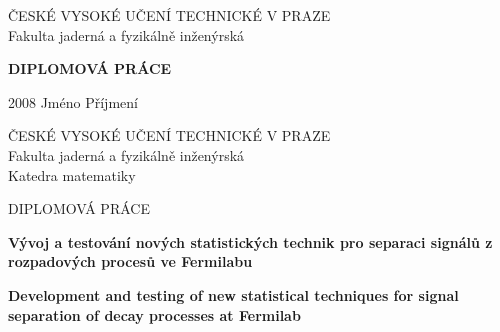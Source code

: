 
\thispagestyle{empty}

\begin{center}

{\Large ČESKÉ VYSOKÉ UČENÍ TECHNICKÉ V PRAZE} \\[3.5mm]
{\Large Fakulta jaderná a fyzikálně inženýrská}


{\Huge\textbf{DIPLOMOVÁ PRÁCE}}


{\Large \hspace*{1cm} 2008 \hfill Jméno Příjmení \hspace*{1cm}}

\end{center}


\newpage

\thispagestyle{empty}

\begin{center}

{\Large ČESKÉ VYSOKÉ UČENÍ TECHNICKÉ V PRAZE} \\[3.5mm]
{\Large Fakulta jaderná a fyzikálně inženýrská} \\[3.5mm]
{\Large Katedra matematiky}


{\Large DIPLOMOVÁ PRÁCE}


{\LARGE
\textbf{Vývoj a testování nových statistických technik pro separaci signálů z rozpadových procesů ve Fermilabu}
\par}

\vspace{1cm}

{\LARGE
\textbf{Development and testing of new statistical techniques for signal separation of decay processes at Fermilab}
\par}


\end{center}

